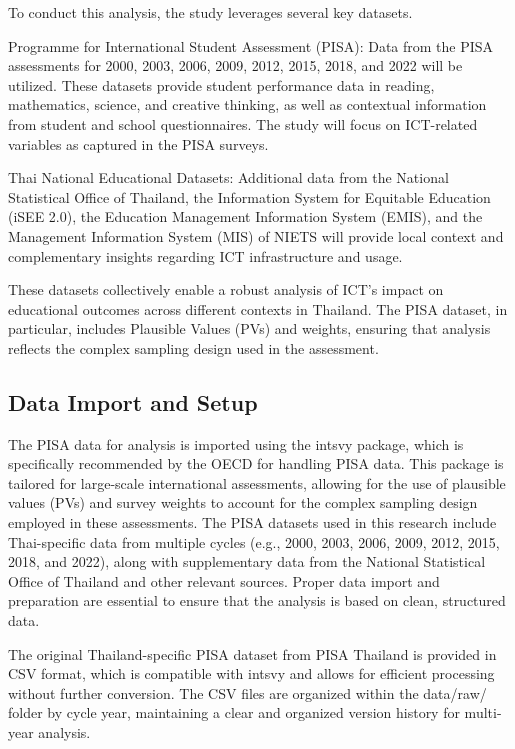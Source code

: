 \documentclass[
]{article}
\begin{document}
To conduct this analysis, the study leverages several key datasets.

Programme for International Student Assessment (PISA): Data from the
PISA assessments for 2000, 2003, 2006, 2009, 2012, 2015, 2018, and 2022
will be utilized. These datasets provide student performance data in
reading, mathematics, science, and creative thinking, as well as
contextual information from student and school questionnaires. The study
will focus on ICT-related variables as captured in the PISA surveys.

Thai National Educational Datasets: Additional data from the National
Statistical Office of Thailand, the Information System for Equitable
Education (iSEE 2.0), the Education Management Information System
(EMIS), and the Management Information System (MIS) of NIETS will
provide local context and complementary insights regarding ICT
infrastructure and usage.

These datasets collectively enable a robust analysis of ICT's impact on
educational outcomes across different contexts in Thailand. The PISA
dataset, in particular, includes Plausible Values (PVs) and weights,
ensuring that analysis reflects the complex sampling design used in the
assessment.

\hypertarget{data-import-and-setup}{%
\subsection{Data Import and Setup}\label{data-import-and-setup}}

The PISA data for analysis is imported using the intsvy package, which
is specifically recommended by the OECD for handling PISA data. This
package is tailored for large-scale international assessments, allowing
for the use of plausible values (PVs) and survey weights to account for
the complex sampling design employed in these assessments. The PISA
datasets used in this research include Thai-specific data from multiple
cycles (e.g., 2000, 2003, 2006, 2009, 2012, 2015, 2018, and 2022), along
with supplementary data from the National Statistical Office of Thailand
and other relevant sources. Proper data import and preparation are
essential to ensure that the analysis is based on clean, structured
data.

The original Thailand-specific PISA dataset from PISA Thailand is
provided in CSV format, which is compatible with intsvy and allows for
efficient processing without further conversion. The CSV files are
organized within the data/raw/ folder by cycle year, maintaining a clear
and organized version history for multi-year analysis.
\end{document}
